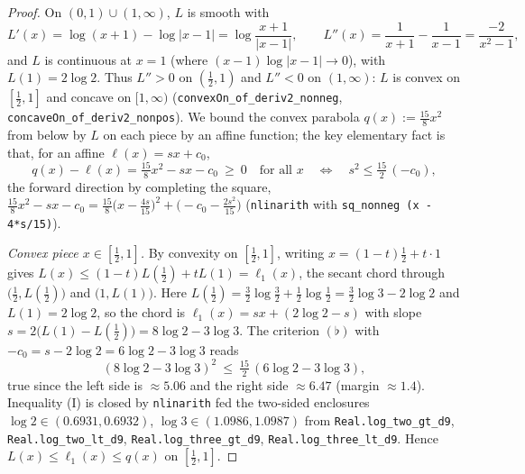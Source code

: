 \begin{proof}
\leanok
{}
On $(0,1)\cup(1,\infty)$, $L$ is smooth with
\[
  L'(x)=\log(x+1)-\log|x-1|=\log\frac{x+1}{|x-1|},\qquad
  L''(x)=\frac1{x+1}-\frac1{x-1}=\frac{-2}{x^2-1},
\]
and $L$ is continuous at $x=1$ (where $(x-1)\log|x-1|\to0$), with $L(1)=2\log2$. Thus
$L''>0$ on $(\tfrac12,1)$ and $L''<0$ on $(1,\infty)$: $L$ is convex on $[\tfrac12,1]$
and concave on $[1,\infty)$ (\texttt{convexOn\_of\_deriv2\_nonneg},
\texttt{concaveOn\_of\_deriv2\_nonpos}). We bound the convex parabola
$q(x):=\tfrac{15}8x^2$ from below by $L$ on each piece by an affine function;
the key elementary fact is that, for an affine $\ell(x)=sx+c_0$,
\[
  q(x)-\ell(x)=\tfrac{15}8x^2-sx-c_0\ \ge\ 0\quad\text{for all }x
  \quad\Longleftrightarrow\quad s^2\le \tfrac{15}{2}\,(-c_0),
  \tag{$\flat$}
\]
the forward direction by completing the square,
$\tfrac{15}8x^2-sx-c_0=\tfrac{15}8\bigl(x-\tfrac{4s}{15}\bigr)^2+\bigl(-c_0-\tfrac{2s^2}{15}\bigr)$
(\texttt{nlinarith} with \texttt{sq\_nonneg (x - 4*s/15)}).

\emph{Convex piece $x\in[\tfrac12,1]$.} By convexity on $[\tfrac12,1]$, writing
$x=(1-t)\tfrac12+t\cdot1$ gives $L(x)\le(1-t)L(\tfrac12)+tL(1)=\ell_1(x)$, the secant
chord through $\bigl(\tfrac12,L(\tfrac12)\bigr)$ and $\bigl(1,L(1)\bigr)$. Here
$L(\tfrac12)=\tfrac32\log\tfrac32+\tfrac12\log\tfrac12=\tfrac32\log3-2\log2$ and
$L(1)=2\log2$, so the chord is $\ell_1(x)=sx+(2\log2-s)$ with slope
$s=2\bigl(L(1)-L(\tfrac12)\bigr)=8\log2-3\log3$. The criterion $(\flat)$ with
$-c_0=s-2\log2=6\log2-3\log3$ reads
\[
  (8\log2-3\log3)^2\ \le\ \tfrac{15}{2}\,(6\log2-3\log3),
  \tag{I}
\]
true since the left side is $\approx5.06$ and the right side $\approx6.47$
(margin $\approx1.4$). Inequality (I) is closed by \texttt{nlinarith} fed the
two-sided enclosures $\log2\in(0.6931,0.6932)$, $\log3\in(1.0986,1.0987)$ from
\texttt{Real.log\_two\_gt\_d9}, \texttt{Real.log\_two\_lt\_d9},
\texttt{Real.log\_three\_gt\_d9}, \texttt{Real.log\_three\_lt\_d9}. Hence
$L(x)\le\ell_1(x)\le q(x)$ on $[\tfrac12,1]$.


\end{proof}
